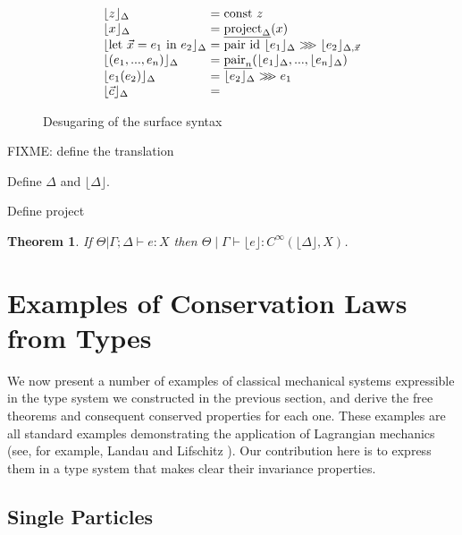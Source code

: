 \documentclass[preprint]{sigplanconf}
\newcommand{\sepbar}{\mathrel|}
\newtheorem{theorem}{Theorem}
\newcommand{\comp}{\mathrel{>\kern-0.45em>\kern-0.45em>}}
\newcommand{\elab}[1]{\lfloor #1 \rfloor}
\theoremstyle{examplestyle}
\begin{document}
\begin{figure}
  \centering
  \begin{displaymath}
    \begin{array}{l@{\hspace{0.3em}}c@{\hspace{0.3em}}l}
      \elab{z}_\Delta & = & \mathrm{const}~z \\
      \elab{x}_\Delta & = & \underline{\mathrm{project}_\Delta}(x) \\
      \elab{\mathrm{let}~\vec{x} = e_1\textrm{ in }e_2}_\Delta & = & \mathrm{pair}~\mathrm{id}~\elab{e_1}_\Delta \comp \elab{e_2}_{\Delta, \vec{x}} \\
      \elab{(e_1,...,e_n)}_\Delta &=& \underline{\mathrm{pair}_n}(\elab{e_1}_\Delta, ..., \elab{e_n}_\Delta) \\
      \elab{e_1(e_2)}_\Delta &=& \elab{e_2}_\Delta \comp e_1 \\
      \elab{\vec{c}}_\Delta &=& 
    \end{array}
  \end{displaymath}
  \caption{Desugaring of the surface syntax}
  \label{fig:desugar}
\end{figure}

FIXME: define the translation

Define $\Delta$ and $\elab{\Delta}$.

Define project

\begin{theorem}
  If $\Theta |\Gamma; \Delta \vdash e : X$ then $\Theta \sepbar
  \Gamma \vdash \elab{e} : C^\infty(\elab{\Delta}, X)$.
\end{theorem}

\section{Examples of Conservation Laws from Types}
\label{sec:examples}

We now present a number of examples of classical mechanical systems
expressible in the type system we constructed in the previous section,
and derive the free theorems and consequent conserved properties for
each one. These examples are all standard examples demonstrating the
application of Lagrangian mechanics (see, for example, Landau and
Lifschitz \cite{landau60mechanics}). Our contribution here is to
express them in a type system that makes clear their invariance
properties.

\subsection{Single Particles}
\end{document}
